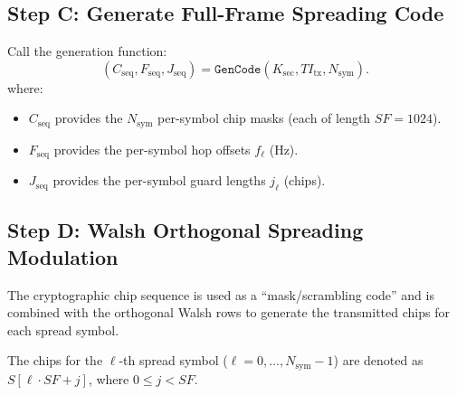 \documentclass[11pt]{article}
\begin{document}
\subsection{Step C: Generate Full-Frame Spreading Code}

Call the generation function:
\[
  (C_{\text{seq}}, F_{\text{seq}}, J_{\text{seq}}) = \texttt{GenCode}(K_{\text{sec}}, \mathit{TI}_{\text{tx}}, N_{\text{sym}}).
\]
where:
\begin{itemize}
\item $C_{\text{seq}}$ provides the $N_{\text{sym}}$ per-symbol chip masks (each of length $\mathit{SF}=1024$).
\item $F_{\text{seq}}$ provides the per-symbol hop offsets $f_\ell$ (Hz).
\item $J_{\text{seq}}$ provides the per-symbol guard lengths $j_\ell$ (chips).
\end{itemize}

\subsection{Step D: Walsh Orthogonal Spreading Modulation}

The cryptographic chip sequence is used as a ``mask/scrambling code'' and is combined with the orthogonal Walsh rows to generate the transmitted chips for each spread symbol.

The chips for the $\ell$-th spread symbol ($\ell=0,\dots,N_{\text{sym}}-1$) are denoted as $S[\ell\cdot \mathit{SF} + j]$, where $0\le j<\mathit{SF}$.
\end{document}
